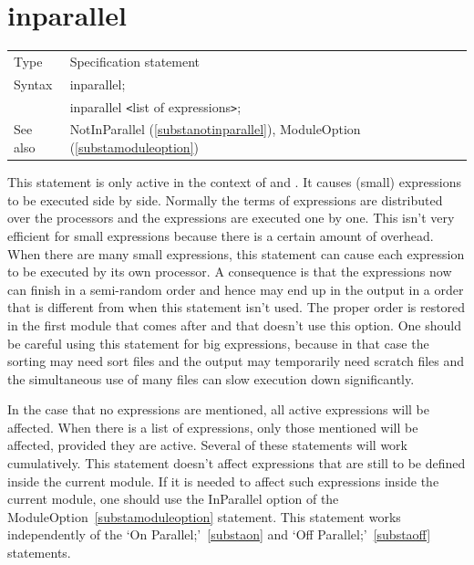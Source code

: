 
\section{inparallel}
\label{substainparallel}

\noindent \begin{tabular}{ll}
Type & Specification statement\\
Syntax & inparallel; \\
       & inparallel {\tt<}list of expressions{\tt>};
\\ See also & NotInParallel (\ref{substanotinparallel}), 
     ModuleOption (\ref{substamoduleoption})
\end{tabular} \vspace{4mm}

\noindent This statement is only active in the context of 
\TFORM{} and \ParFORM{}. It causes 
(small) expressions to be executed side by side. Normally the terms of 
expressions are distributed over the processors and the expressions are 
executed one by one. This isn't very efficient for small expressions 
because there is a certain amount of overhead. When there are many small 
expressions, this statement can cause each expression to be executed by its 
own processor. A consequence is that the expressions now can finish in a 
semi-random order and hence may end up in the output in a order that is 
different from when this statement isn't used. The proper order is restored 
in the first module that comes after and that doesn't use this option. One 
should be careful using this statement for big expressions, because in that 
case the sorting may need sort files and the output may temporarily need 
scratch files and the simultaneous use of many files can slow execution 
down significantly.

\noindent In the case that no expressions are mentioned, all active 
expressions will be affected. When there is a list of expressions, only 
those mentioned will be affected, provided they are active. Several of 
these statements will work cumulatively. This statement doesn't affect 
expressions that are still to be defined inside the current module. If it 
is needed to affect such expressions inside the current module, one should 
use the InParallel option of the 
ModuleOption~\ref{substamoduleoption} 
statement. This statement works independently of the `On 
Parallel;'~\ref{substaon} and `Off Parallel;'~\ref{substaoff} statements.
\vspace{10mm}


